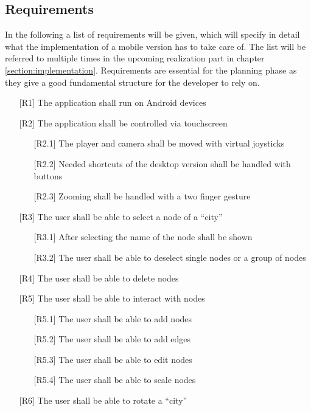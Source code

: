 \subsection{Requirements}
In the following a list of requirements will be given, which will specify in detail what the implementation of a mobile version has to take care of.
The list will be referred to multiple times in the upcoming realization part in chapter \ref{section:implementation}.
Requirements are essential for the planning phase as they give a good fundamental structure for the developer to rely on. \cite{Robertson2012,Stevens2005}
\begin{itemize}
    \item[{[R1]}] The application shall run on Android devices
    \item[{[R2]}] The application shall be controlled via touchscreen
    \begin{itemize}
        \item [{[R2.1]}] The player and camera shall be moved with virtual joysticks
        \item [{[R2.2]}] Needed shortcuts of the desktop version shall be handled with buttons
        \item [{[R2.3]}] Zooming shall be handled with a two finger gesture
    \end{itemize}
    \item[{[R3]}] The user shall be able to select a node of a \enquote{\gls{city}}
    \begin{itemize}
        \item [{[R3.1]}] After selecting the name of the node shall be shown
        \item [{[R3.2]}] The user shall be able to deselect single nodes or a group of nodes
    \end{itemize}
    \item[{[R4]}] The user shall be able to delete nodes
    \item[{[R5]}] The user shall be able to interact with nodes
    \begin{itemize}
        \item [{[R5.1]}] The user shall be able to add nodes
        \item [{[R5.2]}] The user shall be able to add edges
        \item [{[R5.3]}] The user shall be able to edit nodes
        \item [{[R5.4]}] The user shall be able to scale nodes
    \end{itemize}
    \item[{[R6]}] The user shall be able to rotate a \enquote{\gls{city}}

\end{itemize}
